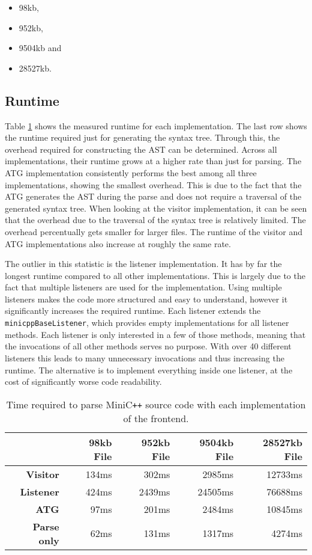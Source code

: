 \begin{itemize}
    \item 98kb,
    \item 952kb,
    \item 9504kb and
    \item 28527kb.
\end{itemize}


\subsection{Runtime}

Table \ref{tab:ParseRuntime} shows the measured runtime for each implementation. The last row shows the runtime required just for generating the syntax tree. Through this, the overhead required for constructing the AST can be determined. Across all implementations, their runtime grows at a higher rate than just for parsing. The ATG implementation consistently performs the best among all three implementations, showing the smallest overhead. This is due to the fact that the ATG generates the AST during the parse and does not require a traversal of the generated syntax tree. When looking at the visitor implementation, it can be seen that the overhead due to the traversal of the syntax tree is relatively limited. The overhead percentually gets smaller for larger files. The runtime of the visitor and ATG implementations also increase at roughly the same rate. 

The outlier in this statistic is the listener implementation. It has by far the longest runtime compared to all other implementations. This is largely due to the fact that multiple listeners are used for the implementation. Using multiple listeners makes the code more structured and easy to understand, however it significantly increases the required runtime. Each listener extends the \verb|minicppBaseListener|, which provides empty implementations for all listener methods. Each listener is only interested in a few of those methods, meaning that the invocations of all other methods serves no purpose. With over 40 different listeners this leads to many unnecessary invocations and thus increasing the runtime. The alternative is to implement everything inside one listener, at the cost of significantly worse code readability.


\begin{table}[!ht]
    \centering
    \caption{Time required to parse MiniC\texttt{++} source code with each implementation of the frontend.}
    \label{tab:ParseRuntime}
    \begin{tabular}{|r|r|r|r|r|}
    \hline
         & 98kb File & 952kb File & 9504kb File & 28527kb File \\ \hline
        \textbf{Visitor} & 134ms & 302ms & 2985ms & 12733ms \\ \hline
        \textbf{Listener} & 424ms & 2439ms & 24505ms & 76688ms \\ \hline
        \textbf{ATG} & 97ms & 201ms & 2484ms & 10845ms \\ \hline
        \textbf{Parse only} & 62ms & 131ms & 1317ms & 4274ms \\ \hline
    \end{tabular}
\end{table}


